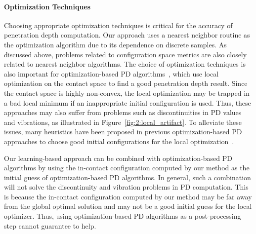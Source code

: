 \paragraph{Optimization Techniques} Choosing appropriate optimization techniques is critical for the accuracy of penetration depth computation. Our approach uses a nearest neighbor routine as the optimization algorithm due to its dependence on discrete samples. As discussed above, problems related to configuration space metrics are also closely related to nearest neighbor algorithms. The choice of optimization techniques is also important for optimization-based PD algorithms~\cite{Nawratil:2009:GPD,Zhang:2007:AFP,Je:2012:PRP,Tang:IGP:2013}, which use local optimization on the contact space to find a good penetration depth result. Since the contact space is highly non-convex, the local optimization may be trapped in a bad local minimum if an inappropriate initial configuration is used. Thus, these approaches may also suffer from problems such as discontinuities in PD values and vibrations, as illustrated in Figure~\ref{fig:2:local_artifact}. To alleviate these issues, many heuristics have been proposed in previous optimization-based PD approaches to choose good initial configurations for the local optimization~\cite{Je:2012:PRP,Tang:IGP:2013}.

Our learning-based approach can be combined with optimization-based PD algorithms by using the in-contact configuration computed by our method as the initial guess of optimization-based PD algorithms. In general, such a combination will not solve the discontinuity and vibration problems in PD computation. This is because the in-contact configuration computed by our method may be far away from the global optimal solution and may not be a good initial guess for the local optimizer. Thus, using optimization-based PD algorithms as a post-processing step cannot guarantee to help. 

